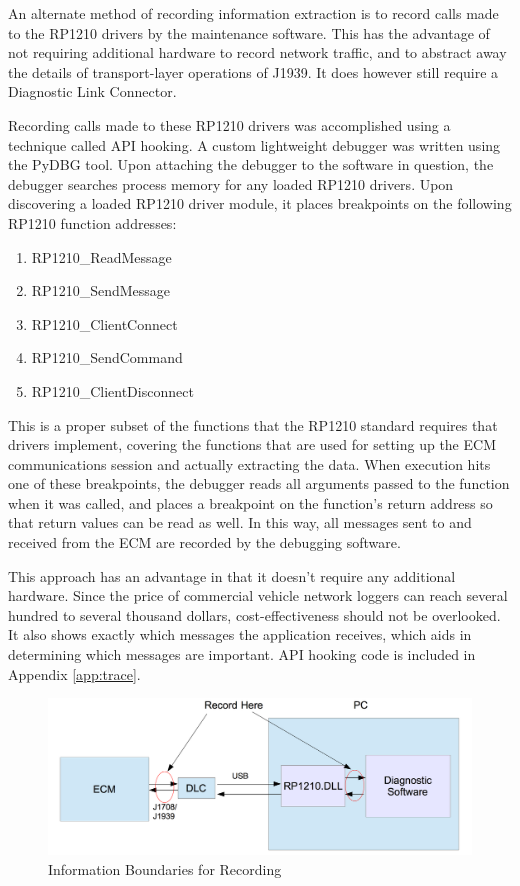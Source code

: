 An alternate method of recording information extraction is to record calls made to the RP1210 drivers
by the maintenance software. This has the advantage of not requiring additional hardware to 
record network traffic, and to abstract away the details of transport-layer operations of J1939. It does however
still require a Diagnostic Link Connector.

Recording calls made to these RP1210 drivers was accomplished using a technique called API hooking\cite{Berdajs2010}.
A custom lightweight debugger was written using the PyDBG tool\cite{Amini2012}. Upon attaching the debugger to the software
in question, the debugger searches process memory for any loaded RP1210 drivers. Upon discovering a loaded RP1210
driver module, it places breakpoints on the following RP1210 function addresses:

\begin{enumerate}
  \item RP1210\_ReadMessage
  \item RP1210\_SendMessage
  \item RP1210\_ClientConnect
  \item RP1210\_SendCommand
  \item RP1210\_ClientDisconnect
\end{enumerate}

This is a proper subset of the functions that the RP1210 standard requires that drivers implement, covering the functions that
are used for setting up the ECM communications session and actually extracting the data.
When execution hits one of these breakpoints, the debugger reads all arguments passed to the function when it was called,
and places a breakpoint on the function's return address so that return values can be read as well. In this way, all
messages sent to and received from the ECM are recorded by the debugging software.

This approach has an advantage in that it doesn't require any additional hardware. Since the price of 
commercial vehicle network loggers can reach several hundred to several thousand dollars, cost-effectiveness should
not be overlooked. It also shows exactly which messages the application receives, which aids in determining which
messages are important. API hooking code is included in Appendix \ref{app:trace}.

\begin{figure}[h]
  \centering
  \includegraphics[scale=0.5]{RecordPoint}
  \caption{Information Boundaries for Recording}
  \label{fig:infoboundaries}
\end{figure}

